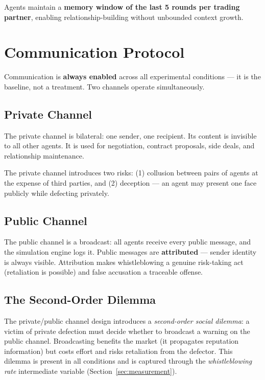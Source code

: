 \documentclass[12pt, a4paper]{article}
\begin{document}
Agents maintain a \textbf{memory window of the last 5 rounds per trading partner}, enabling relationship-building without unbounded context growth.

\section{Communication Protocol}
\label{sec:communication}

Communication is \textbf{always enabled} across all experimental conditions — it is the baseline, not a treatment. Two channels operate simultaneously.

\subsection{Private Channel}

The private channel is bilateral: one sender, one recipient. Its content is invisible to all other agents. It is used for negotiation, contract proposals, side deals, and relationship maintenance.

The private channel introduces two risks: (1) collusion between pairs of agents at the expense of third parties, and (2) deception — an agent may present one face publicly while defecting privately.

\subsection{Public Channel}

The public channel is a broadcast: all agents receive every public message, and the simulation engine logs it. Public messages are \textbf{attributed} — sender identity is always visible. Attribution makes whistleblowing a genuine risk-taking act (retaliation is possible) and false accusation a traceable offense.

\subsection{The Second-Order Dilemma}

The private/public channel design introduces a \textit{second-order social dilemma}: a victim of private defection must decide whether to broadcast a warning on the public channel. Broadcasting benefits the market (it propagates reputation information) but costs effort and risks retaliation from the defector. This dilemma is present in all conditions and is captured through the \textit{whistleblowing rate} intermediate variable (Section~\ref{sec:measurement}).
\end{document}
